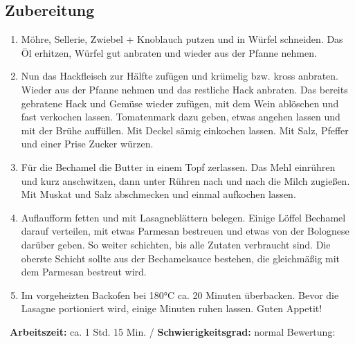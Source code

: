 \begin{minipage}[t]{0.58\textwidth}
\vspace{0pt}
\subsection*{Zubereitung}
\begin{enumerate}[leftmargin=*, itemindent=14pt]
\item Möhre, Sellerie, Zwiebel + Knoblauch putzen und in Würfel schneiden. Das Öl erhitzen, Würfel gut anbraten und wieder aus der Pfanne nehmen. 

\item Nun das Hackfleisch zur Hälfte zufügen und krümelig bzw. kross anbraten. Wieder aus der Pfanne nehmen und das restliche Hack anbraten. Das bereits gebratene Hack und Gemüse wieder zufügen, mit dem Wein ablöschen und fast verkochen lassen. Tomatenmark dazu geben, etwas angehen lassen und mit der Brühe auffüllen. Mit Deckel sämig einkochen lassen. Mit Salz, Pfeffer und einer Prise Zucker würzen.

\item Für die Bechamel die Butter in einem Topf zerlassen. Das Mehl einrühren und kurz anschwitzen, dann unter Rühren nach und nach die Milch zugießen. Mit Muskat und Salz abschmecken und einmal aufkochen lassen.

\item Auflaufform fetten und mit Lasagneblättern belegen. Einige Löffel Bechamel darauf verteilen, mit etwas Parmesan bestreuen und etwas von der Bolognese darüber geben. So weiter schichten, bis alle Zutaten verbraucht sind. Die oberste Schicht sollte aus der Bechamelsauce bestehen, die gleichmäßig mit dem Parmesan bestreut wird.

\item Im vorgeheizten Backofen bei 180°C ca. 20 Minuten überbacken. Bevor die Lasagne portioniert wird, einige Minuten ruhen lassen. Guten Appetit!
\end{enumerate}
\end{minipage}
\vfill
\decothreeright \, \textbf{Arbeitszeit:} ca. 1 Std. 15 Min. / \textbf{Schwierigkeitsgrad:} normal \decothreeleft \hfill Bewertung:  \CIRCLE  \CIRCLE \CIRCLE \CIRCLE \CIRCLE 